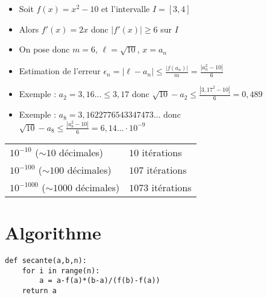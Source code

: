 \begin{frame}
\begin{exemple}
\begin{itemize}\setlength{\itemsep}{4pt}
  \item Soit $f(x)=x^2-10$ et l'intervalle $I=[3,4]$
\pause
  \item Alors $f'(x)=2x$ donc $|f'(x)| \ge 6$ sur $I$
\pause  
  \item On pose donc $m=6$, $\ell=\sqrt{10}$, $x=a_n$
\pause  
  \item Estimation de l'erreur $\epsilon_n = |\ell-a_n| \le \frac{|f(a_n)|}{m} = \frac{|a_n^2 - 10|}{6}$
\pause  
  \item Exemple : $a_2 = 3,16... \le 3,17$ donc $\sqrt{10}-a_2 \le \frac{|3,17^2-10|}{6} = 0,489$
\pause  
  \item Exemple : $a_8=3,1622776543347473\ldots$ donc \\ \hfill $\sqrt{10}-a_8 \le \frac{|a_8^2-10|}{6} = 6,14\ldots \cdot 10^{-9}$
\end{itemize}

\end{exemple}

\medskip
\pause

\begin{center}
\begin{tabular}{ll}
  $10^{-10}$ ($\sim 10$ décimales) &  $10$ itérations \\
  $10^{-100}$ ($\sim 100$ décimales) &  $107$ itérations \\ 
  $10^{-1000}$ ($\sim 1000$ décimales) &  $1073$ itérations \\ 
\end{tabular}  
\end{center}
\end{frame}


\section{Algorithme}

\begin{frame}[fragile]

\begin{algo}[secante.py]
\begin{lstlisting}
def secante(a,b,n):  
    for i in range(n):
        a = a-f(a)*(b-a)/(f(b)-f(a))
    return a
\end{lstlisting}  
\end{algo}   
    
\end{frame}


